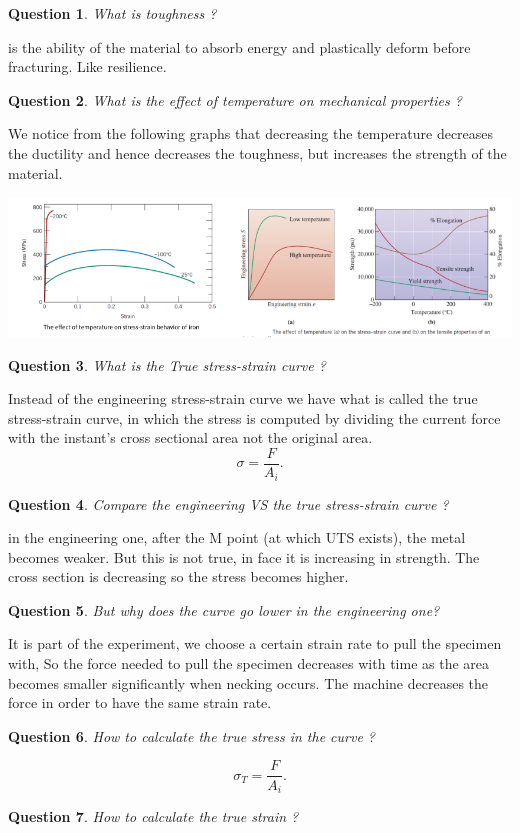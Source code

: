 \documentclass[13]{article}
\newtheorem{exer}{Question}
\begin{document}
\begin{exer}
What is toughness ?
\end{exer}
is the ability of the material to absorb energy and plastically deform before fracturing. Like resilience. 
\begin{exer}
What is the effect of temperature on mechanical properties ?
\end{exer}
We notice from the following graphs that decreasing the temperature decreases the ductility and hence decreases the toughness, but increases the strength of the material.
\begin{center}
\includegraphics[scale=0.5]{figures/7.png}
\end{center}
\begin{exer}
What is the True stress-strain curve ?
\end{exer}
Instead of the engineering stress-strain curve we have what is called the true stress-strain curve, in which the stress is computed by dividing the current force with the instant's cross sectional area not the original area.
\[
\sigma = \frac{F}{A_i}
.\] 
\begin{exer}
Compare the engineering VS the true stress-strain curve ?
\end{exer}
in the engineering one, after the M point (at which UTS exists), the metal becomes weaker. But this is not true, in face it is increasing in strength. The cross section is decreasing so the stress becomes higher.\\
\begin{exer}
But why does the curve go lower in the engineering one? 
\end{exer}
It is part of the experiment, we choose a certain strain rate to pull the specimen with, So the force needed to pull the specimen decreases with time as the area becomes smaller significantly when necking occurs. The machine decreases the force in order to have the same strain rate.
\begin{exer}
How to calculate the true stress in the curve ?
\end{exer}
\[
\sigma_T = \frac{F}{A_i} 
.\] 
\begin{exer}
How to calculate the true strain ?
\end{exer}
\end{document}
